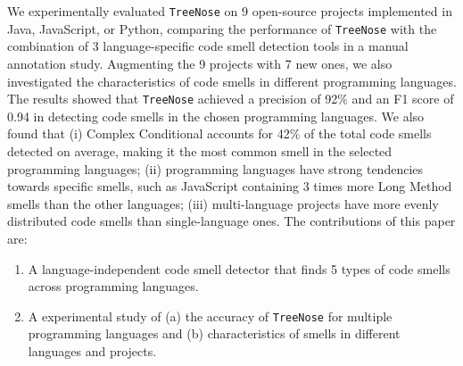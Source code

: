 We experimentally evaluated \texttt{TreeNose} on 9 open-source projects
implemented in Java, JavaScript, or Python, comparing the performance of
\texttt{TreeNose} with the combination of 3 language-specific code smell
detection tools in a manual annotation study. Augmenting the 9 projects with 7
new ones, we also investigated the characteristics of code smells in different
programming languages.
%
%
The results showed that \texttt{TreeNose} achieved a precision of 92\% and an F1
score of 0.94 in detecting code smells in the chosen programming languages. We
also found that (i) Complex Conditional accounts for 42\% of the total code
smells detected on average, making it the most common smell in the selected
programming languages; (ii) programming languages have strong tendencies towards
specific smells, such as JavaScript containing 3 times more Long Method smells
than the other languages; (iii) multi-language projects have more evenly
distributed code smells than single-language ones.
%
%
The contributions of this paper are:

\begin{enumerate}
    \item A language-independent code smell detector that finds 5 types of code
        smells across programming languages.
    \item A experimental study of (a) the accuracy of \texttt{TreeNose}
        for multiple programming languages and (b) characteristics of
        smells in different languages and projects.
\end{enumerate}
